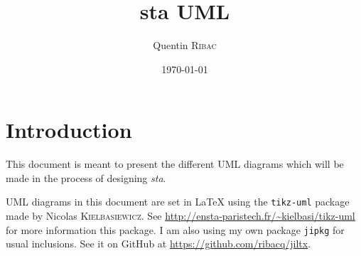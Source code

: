 \documentclass[a4paper, 11pt]{article}
\title{sta UML}
\author{Quentin \textsc{Ribac}}
\date{\today}
\begin{document}
\maketitle
\section*{Introduction}
This document is meant to present the different UML diagrams which will be made in the process of designing \emph{sta}.

UML diagrams in this document are set in \LaTeX{} using the \texttt{tikz-uml} package made by Nicolas \textsc{Kielbasiewicz}. See \url{http://ensta-paristech.fr/~kielbasi/tikz-uml} for more information this package. I am also using my own package \texttt{jipkg} for usual inclusions. See it on GitHub at \url{https://github.com/ribacq/jiltx}.
\end{document}
